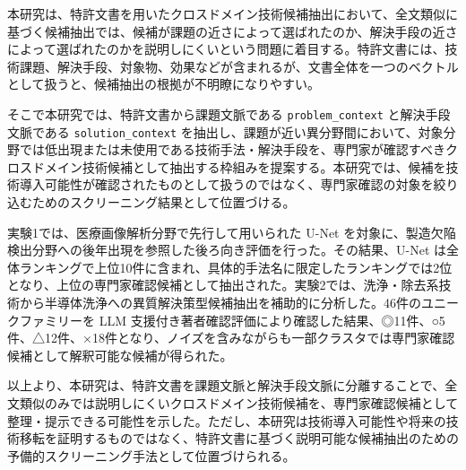 本研究は、特許文書を用いたクロスドメイン技術候補抽出において、全文類似に基づく候補抽出では、候補が課題の近さによって選ばれたのか、解決手段の近さによって選ばれたのかを説明しにくいという問題に着目する。特許文書には、技術課題、解決手段、対象物、効果などが含まれるが、文書全体を一つのベクトルとして扱うと、候補抽出の根拠が不明瞭になりやすい。

そこで本研究では、特許文書から課題文脈である \texttt{problem\_context} と解決手段文脈である \texttt{solution\_context} を抽出し、課題が近い異分野間において、対象分野では低出現または未使用である技術手法・解決手段を、専門家が確認すべきクロスドメイン技術候補として抽出する枠組みを提案する。本研究では、候補を技術導入可能性が確認されたものとして扱うのではなく、専門家確認の対象を絞り込むためのスクリーニング結果として位置づける。

実験1では、医療画像解析分野で先行して用いられた U-Net を対象に、製造欠陥検出分野への後年出現を参照した後ろ向き評価を行った。その結果、U-Net は全体ランキングで上位10件に含まれ、具体的手法名に限定したランキングでは2位となり、上位の専門家確認候補として抽出された。実験2では、洗浄・除去系技術から半導体洗浄への異質解決策型候補抽出を補助的に分析した。46件のユニークファミリーを LLM 支援付き著者確認評価により確認した結果、◎11件、○5件、△12件、×18件となり、ノイズを含みながらも一部クラスタでは専門家確認候補として解釈可能な候補が得られた。

以上より、本研究は、特許文書を課題文脈と解決手段文脈に分離することで、全文類似のみでは説明しにくいクロスドメイン技術候補を、専門家確認候補として整理・提示できる可能性を示した。ただし、本研究は技術導入可能性や将来の技術移転を証明するものではなく、特許文書に基づく説明可能な候補抽出のための予備的スクリーニング手法として位置づけられる。
